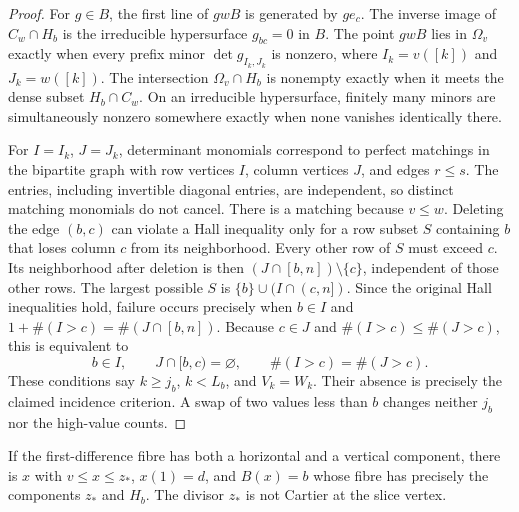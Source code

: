 \begin{proof}
For $g\in B$, the first line of $gwB$ is generated by $ge_c$.
The inverse image of $C_w\cap H_b$ is the irreducible hypersurface
$g_{bc}=0$ in $B$. The point $gwB$ lies in $\Omega_v$ exactly when
every prefix minor $\det g_{I_k,J_k}$ is nonzero, where $I_k=v([k])$
and $J_k=w([k])$.
The intersection $\Omega_v\cap H_b$ is nonempty exactly when it meets the
dense subset $H_b\cap C_w$. On an irreducible hypersurface, finitely
many minors are simultaneously nonzero somewhere exactly when none
vanishes identically there.

For $I=I_k$, $J=J_k$, determinant monomials correspond to perfect
matchings in the bipartite graph with row vertices $I$, column vertices
$J$, and edges $r\leq s$. The entries, including invertible diagonal
entries, are independent, so distinct matching monomials do not cancel.
There is a matching because $v\leq w$. Deleting the edge $(b,c)$
can violate a Hall inequality only for a row subset $S$ containing
$b$ that loses column $c$ from its neighborhood. Every other row of
$S$ must exceed $c$. Its neighborhood after deletion is then
$(J\cap[b,n])\setminus\{c\}$, independent of those other rows.
The largest possible $S$ is $\{b\}\cup(I\cap(c,n])$.
Since the original Hall inequalities hold, failure occurs precisely
when $b\in I$ and $1+\#(I>c)=\#(J\cap[b,n])$.
Because $c\in J$ and $\#(I>c)\leq\#(J>c)$, this is equivalent to
\[
 b\in I,\qquad J\cap[b,c)=\varnothing,\qquad
 \#(I>c)=\#(J>c).
\]
These conditions say $k\geq j_b$, $k<L_b$, and $V_k=W_k$.
Their absence is precisely the claimed incidence criterion.
A swap of two values less than $b$ changes neither $j_b$ nor the
high-value counts.
\end{proof}

\begin{lemma}\label{ta:two_components}
If the first-difference fibre has both a horizontal and a vertical
component, there is $x$ with $v\leq x\leq z_*$, $x(1)=d$, and
$B(x)=b$ whose fibre has precisely the components $z_*$ and $H_b$.
The divisor $z_*$ is not Cartier at the slice vertex.
\end{lemma}

